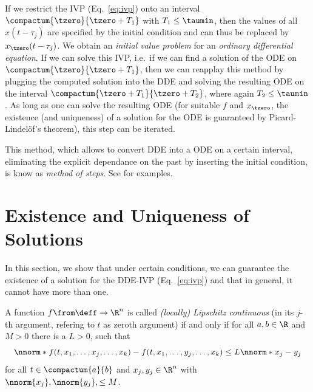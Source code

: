     If we restrict the IVP (Eq.~\ref{eq:ivp}) onto an interval $\compactum{\tzero}{\tzero+T_1}$ with $T_1\leq\taumin$, then the values of all $x(t-\tau_j)$ are specified by the initial condition and can thus be replaced by $x_{\tzero}(t-\tau_j)$.
    We obtain an \emph{initial value problem} for an \emph{ordinary differential equation}.
    If we can solve this IVP, i.e.\ if we can find a solution of the ODE on $\compactum{\tzero}{\tzero+T_1}$, then we can reapplay this method by plugging the computed solution into the DDE and solving the resulting ODE on the interval $\compactum{\tzero+T_1}{\tzero+T_2}$, where again $T_2\leq\taumin$. As long as one can solve the resulting ODE (for suitable $f$ and $x_{\tzero}$, the existence (and uniqueness) of a solution for the ODE is guaranteed by Picard-Lindelöf's theorem), this step can be iterated.

    This method, which allows to convert DDE into a ODE on a certain interval, eliminating the explicit dependance on the past by inserting the initial condition, is know as \emph{method of steps}.
    See \cite{Falbo06FDEs} for examples.



\section{Existence and Uniqueness of Solutions}
    \label{solutions-existence-uniqueness}

    In this section, we show that under certain conditions, we can guarantee the existence of a solution for the DDE-IVP (Eq.~\ref{eq:ivp}) and that in general, it cannot have more than one. 


    \begin{definition}\label{def:lipschitz}
        A function $f\from\deff\to\R^n$ is called \emph{(locally) Lipschitz continuous} (in its $j$-th argument, refering to $t$ as zeroth argument) if and only if for all $a,b\in\R$ and $M>0$ there is a $L>0$, such that
        \begin{equation*}
            \nnorm*{f(t,x_1,\ldots,x_j,\ldots,x_k) - f(t,x_1,\ldots,y_j,\ldots,x_k)} \leq L\nnorm*{x_j-y_j}
        \end{equation*}
        for all $t\in\compactum{a}{b}$ and $x_j,y_j\in\R^n$ with $\nnorm{x_j},\nnorm{y_j},\leq M$.
    \end{definition}

